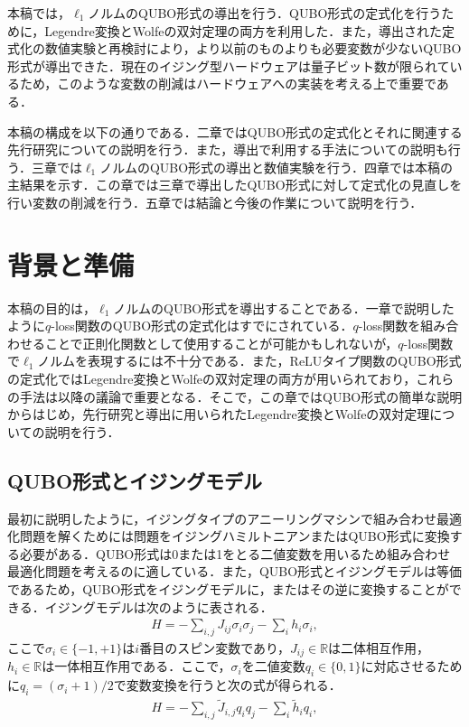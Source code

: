 \documentclass[fp,twocolumn]{jpsj3}
\begin{document}
本稿では，$\ell_{1}$ノルムのQUBO形式の導出を行う．QUBO形式の定式化を行うために，Legendre変換とWolfeの双対定理の両方を利用した．また，導出された定式化の数値実験と再検討により，より以前のものよりも必要変数が少ないQUBO形式が導出できた．現在のイジング型ハードウェアは量子ビット数が限られているため，このような変数の削減はハードウェアへの実装を考える上で重要である．

本稿の構成を以下の通りである．二章ではQUBO形式の定式化とそれに関連する先行研究についての説明を行う．また，導出で利用する手法についての説明も行う．三章では$\ell_{1}$ノルムのQUBO形式の導出と数値実験を行う．四章では本稿の主結果を示す．この章では三章で導出したQUBO形式に対して定式化の見直しを行い変数の削減を行う．五章では結論と今後の作業について説明を行う．
\section{背景と準備}
本稿の目的は，$\ell_{1}$ノルムのQUBO形式を導出することである．一章で説明したように$q$-loss関数のQUBO形式の定式化はすでにされている．$q$-loss関数を組み合わせることで正則化関数として使用することが可能かもしれないが，$q$-loss関数で$\ell_{1}$ノルムを表現するには不十分である．また，ReLUタイプ関数のQUBO形式の定式化ではLegendre変換とWolfeの双対定理の両方が用いられており，これらの手法は以降の議論で重要となる．そこで，この章ではQUBO形式の簡単な説明からはじめ，先行研究と導出に用いられたLegendre変換とWolfeの双対定理についての説明を行う．

\subsection{QUBO形式とイジングモデル}
最初に説明したように，イジングタイプのアニーリングマシンで組み合わせ最適化問題を解くためには問題をイジングハミルトニアンまたはQUBO形式に変換する必要がある．QUBO形式は0または1をとる二値変数を用いるため組み合わせ最適化問題を考えるのに適している．また，QUBO形式とイジングモデルは等価であるため，QUBO形式をイジングモデルに，またはその逆に変換することができる．イジングモデルは次のように表される．
\begin{eqnarray}
  H = -\sum_{i,j}{J_{ij}\sigma_{i}\sigma_{j}}-\sum_{i}{h_{i}\sigma_{i}},
\end{eqnarray}
ここで$\sigma_{i}\in\{ -1,+1\}$は$i$番目のスピン変数であり，$J_{ij}\in\mathbb{R}$は二体相互作用，$h_{i}\in\mathbb{R}$は一体相互作用である．ここで，$\sigma_{i}$を二値変数$q_{i}\in\{0,1\}$に対応させるために$q_{i}=(\sigma_{i}+1)/2$で変数変換を行うと次の式が得られる．
\begin{eqnarray}
  H = -\sum_{i,j}{\widetilde{J}_{i,j}q_{i}q_{j}}-\sum_{i}{\widetilde{h}_{i}q_{i}},
\end{eqnarray}
\end{document}

